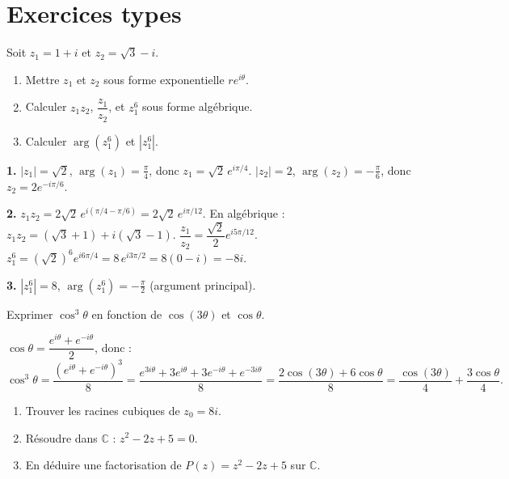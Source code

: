 \documentclass[11pt,a4paper,twoside]{book}
\newcommand{\C}{\mathbb{C}}
\begin{document}
\section{Exercices types}

\begin{exercicebox}
Soit $z_1 = 1+i$ et $z_2 = \sqrt{3}-i$.
\begin{enumerate}
  \item Mettre $z_1$ et $z_2$ sous forme exponentielle $re^{i\theta}$.
  \item Calculer $z_1 z_2$, $\dfrac{z_1}{z_2}$, et $z_1^6$ sous forme algébrique.
  \item Calculer $\arg(z_1^6)$ et $|z_1^6|$.
\end{enumerate}
\end{exercicebox}

\begin{correctionbox}[Correction]
\textbf{1.} $|z_1|=\sqrt{2}$, $\arg(z_1)=\frac{\pi}{4}$, donc $z_1=\sqrt{2}\,e^{i\pi/4}$.
$|z_2|=2$, $\arg(z_2)=-\frac{\pi}{6}$, donc $z_2=2e^{-i\pi/6}$.

\textbf{2.} $z_1 z_2 = 2\sqrt{2}\,e^{i(\pi/4-\pi/6)} = 2\sqrt{2}\,e^{i\pi/12}$.
En algébrique : $z_1 z_2 = (\sqrt{3}+1) + i(\sqrt{3}-1)$.
$\dfrac{z_1}{z_2} = \dfrac{\sqrt{2}}{2}e^{i5\pi/12}$.
$z_1^6 = (\sqrt{2})^6 e^{i6\pi/4} = 8\,e^{i3\pi/2} = 8(0-i) = -8i$.

\textbf{3.} $|z_1^6|=8$, $\arg(z_1^6) = -\frac{\pi}{2}$ (argument principal).
\end{correctionbox}

\begin{exercicebox}[Linéarisation]
Exprimer $\cos^3\theta$ en fonction de $\cos(3\theta)$ et $\cos\theta$.
\end{exercicebox}

\begin{correctionbox}[Correction]
$\cos\theta = \dfrac{e^{i\theta}+e^{-i\theta}}{2}$, donc :
\[
\cos^3\theta = \frac{(e^{i\theta}+e^{-i\theta})^3}{8}
= \frac{e^{3i\theta}+3e^{i\theta}+3e^{-i\theta}+e^{-3i\theta}}{8}
= \frac{2\cos(3\theta)+6\cos\theta}{8} = \frac{\cos(3\theta)}{4}+\frac{3\cos\theta}{4}.
\]
\end{correctionbox}

\begin{exercicebox}
\begin{enumerate}
  \item Trouver les racines cubiques de $z_0 = 8i$.
  \item Résoudre dans $\C$ : $z^2 - 2z + 5 = 0$.
  \item En déduire une factorisation de $P(z)=z^2-2z+5$ sur $\C$.
\end{enumerate}
\end{exercicebox}
\end{document}

